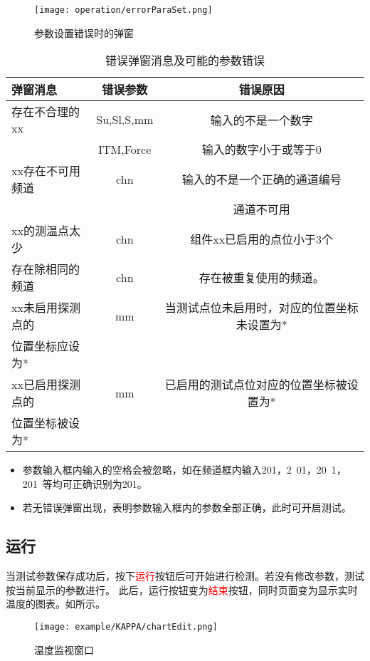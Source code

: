 \begin{figure}[H]
    \centering
    \texttt{[image: operation/errorParaSet.png]}
    \caption{ 参数设置错误时的弹窗 \label{fig:errorParaSet}}
\end{figure}
\begin{table}[htbp]
    \centering
    \caption{ 错误弹窗消息及可能的参数错误 \label{tab:errorInfoNormalUser}}
    \begin{tabular}{@{}lcc@{}}
        \toprule
        弹窗消息                        & 错误参数   & 错误原因                                    \\ \midrule
        存在不合理的xx                  & Su,Sl,S,mm & 输入的不是一个数字                          \\
                                        & ITM,Force  & 输入的数字小于或等于0                       \\
        xx存在不可用频道                & chn        & 输入的不是一个正确的通道编号                \\
                                        &            & 通道不可用                                  \\
        xx的测温点太少                  & chn        & 组件xx已启用的点位小于3个                   \\
        存在除相同的频道                & chn        & 存在被重复使用的频道。                      \\
        xx未启用探测点的 & mm         & 当测试点位未启用时，对应的位置坐标未设置为* \\
        位置坐标应设为*& & \\
        xx已启用探测点的 & mm         & 已启用的测试点位对应的位置坐标被设置为*     \\
        位置坐标被设为* & & \\
        \bottomrule
    \end{tabular}
\end{table}
\begin{note}
    \begin{itemize}
        \item 参数输入框内输入的空格会被忽略，如在频道框内输入201，2\ 01，20\ 1，201\ 等均可正确识别为201。
        \item 若无错误弹窗出现，表明参数输入框内的参数全部正确，此时可开启测试。
    \end{itemize}
\end{note}
\subsection{运行}
当测试参数保存成功后，按下\textcolor{red}{运行}按钮后可开始进行检测。若没有修改参数，测试按当前显示的参数进行。
此后，运行按钮变为\textcolor{red}{结束}按钮，同时页面变为显示实时温度的图表。如所示。
\begin{figure}[H]
    \centering
    \texttt{[image: example/KAPPA/chartEdit.png]}
    \caption{ 温度监视窗口 \label{fig:tempChart}}
\end{figure}
